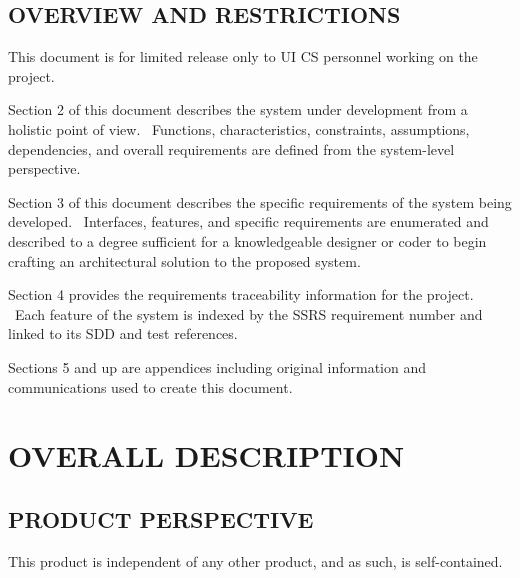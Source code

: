 \documentclass[twoside,letterpaper]{article}
\begin{document}
\subsection[OVERVIEW AND RESTRICTIONS]{\rmfamily\bfseries\color{black}
OVERVIEW AND RESTRICTIONS}
{\color{black}
This document is for limited release only to UI CS personnel working on
the project.}


\bigskip

{\color{black}
Section 2 of this document describes the system under development from a
holistic point of view. \ Functions, characteristics, constraints,
assumptions, dependencies, and overall requirements are defined from
the system-level perspective.}


\bigskip

{\color{black}
Section 3 of this document describes the specific requirements of the
system being developed. \ Interfaces, features, and specific
requirements are enumerated and described to a degree sufficient for a
knowledgeable designer or coder to begin crafting an architectural
solution to the proposed system.}


\bigskip

{\color{black}
Section 4 provides the requirements traceability information for the
project. \ Each feature of the system is indexed by the SSRS
requirement number and linked to its SDD and test references.}


\bigskip

{\color{black}
Sections 5 and up are appendices including original information and
communications used to create this document.}











\clearpage\section[OVERALL DESCRIPTION]{\rmfamily\bfseries\color{black}
OVERALL DESCRIPTION}

\subsection[PRODUCT PERSPECTIVE]{\rmfamily\bfseries\color{black}
PRODUCT PERSPECTIVE}
{\color{black}
This product is independent of any other product, and as such, is self-contained.
}
\end{document}
